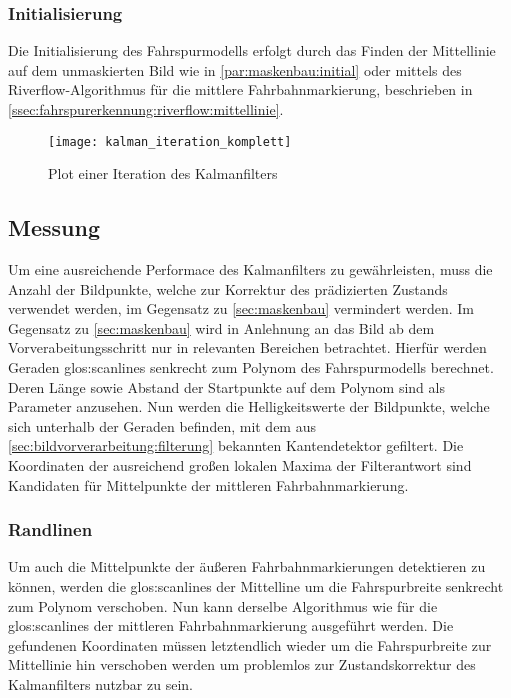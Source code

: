 \subsubsection{Initialisierung} 
\label{sssec:fahrspurerkennung:kalman:fahrspurmodell:initialisierung}
 Die Initialisierung des Fahrspurmodells erfolgt durch das Finden der Mittellinie auf dem unmaskierten Bild wie in \ref{par:maskenbau:initial} oder mittels des Riverflow-Algorithmus für die mittlere Fahrbahnmarkierung, beschrieben in \ref{ssec:fahrspurerkennung:riverflow:mittellinie}.
 
 \begin{figure}[htb]
 	\centering
 	\texttt{[image: kalman\_iteration\_komplett]}
 	\caption{Plot einer Iteration des Kalmanfilters}
 	\label{fig:kalman:iteration_komplett}
 \end{figure}
 
\subsection{Messung} \label{ssec:fahrspurerkennung:kalman:messung}
Um eine ausreichende Performace des Kalmanfilters zu gewährleisten, muss die Anzahl der Bildpunkte, welche zur Korrektur des prädizierten Zustands verwendet werden, im Gegensatz zu \ref{sec:maskenbau} vermindert werden. Im Gegensatz zu \ref{sec:maskenbau} wird in Anlehnung an \autocite{risackRobustLaneRecognition} das Bild ab dem Vorverabeitungsschritt nur in relevanten Bereichen betrachtet.
Hierfür werden Geraden \glqq \glspl{glos:scanline}\grqq{} senkrecht zum Polynom des Fahrspurmodells berechnet. Deren Länge sowie Abstand der Startpunkte auf dem Polynom sind als Parameter anzusehen. Nun werden die Helligkeitswerte der Bildpunkte, welche sich unterhalb der Geraden befinden, mit dem aus \ref{sec:bildvorverarbeitung:filterung} bekannten Kantendetektor gefiltert. Die Koordinaten der ausreichend großen lokalen Maxima der Filterantwort sind Kandidaten für Mittelpunkte der mittleren Fahrbahnmarkierung.

\subsubsection{Randlinen}
Um auch die Mittelpunkte der äußeren Fahrbahnmarkierungen detektieren zu können, werden die \glspl{glos:scanline} der Mittelline um die Fahrspurbreite senkrecht zum Polynom verschoben. Nun kann derselbe Algorithmus wie für die \glspl{glos:scanline} der mittleren Fahrbahnmarkierung ausgeführt werden. Die gefundenen Koordinaten müssen letztendlich wieder um die Fahrspurbreite zur Mittellinie hin verschoben werden um problemlos zur Zustandskorrektur des Kalmanfilters nutzbar zu sein.
 
